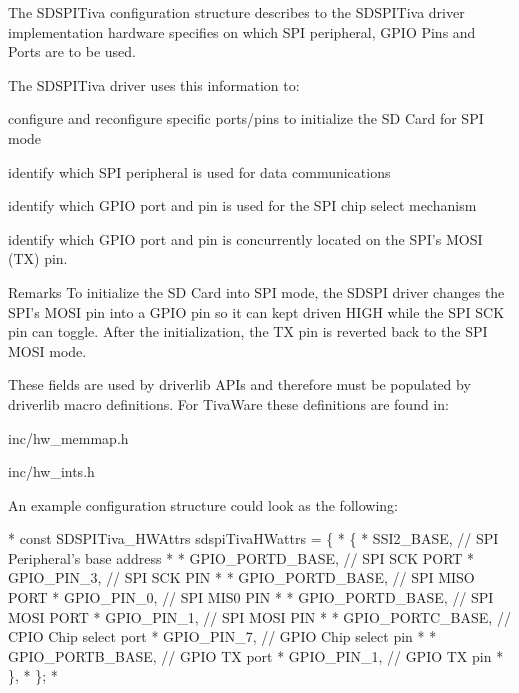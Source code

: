 The S\-D\-S\-P\-I\-Tiva configuration structure describes to the S\-D\-S\-P\-I\-Tiva driver implementation hardware specifies on which S\-P\-I peripheral, G\-P\-I\-O Pins and Ports are to be used.

The S\-D\-S\-P\-I\-Tiva driver uses this information to\-:
\begin{DoxyItemize}
\item configure and reconfigure specific ports/pins to initialize the S\-D Card for S\-P\-I mode
\item identify which S\-P\-I peripheral is used for data communications
\item identify which G\-P\-I\-O port and pin is used for the S\-P\-I chip select mechanism
\item identify which G\-P\-I\-O port and pin is concurrently located on the S\-P\-I's M\-O\-S\-I (T\-X) pin.
\end{DoxyItemize}

\begin{DoxyRemark}{Remarks}
To initialize the S\-D Card into S\-P\-I mode, the S\-D\-S\-P\-I driver changes the S\-P\-I's M\-O\-S\-I pin into a G\-P\-I\-O pin so it can kept driven H\-I\-G\-H while the S\-P\-I S\-C\-K pin can toggle. After the initialization, the T\-X pin is reverted back to the S\-P\-I M\-O\-S\-I mode.
\end{DoxyRemark}
These fields are used by driverlib A\-P\-Is and therefore must be populated by driverlib macro definitions. For Tiva\-Ware these definitions are found in\-:
\begin{DoxyItemize}
\item inc/hw\-\_\-memmap.\-h
\item inc/hw\-\_\-ints.\-h
\end{DoxyItemize}

An example configuration structure could look as the following\-: 
\begin{DoxyCode}
*  \textcolor{keyword}{const} SDSPITiva_HWAttrs sdspiTivaHWattrs = \{
*      \{
*           SSI2\_BASE, \textcolor{comment}{// SPI Peripheral's base address}
*
*           GPIO\_PORTD\_BASE, \textcolor{comment}{// SPI SCK PORT}
*           GPIO\_PIN\_3,      \textcolor{comment}{// SPI SCK PIN}
*
*           GPIO\_PORTD\_BASE, \textcolor{comment}{// SPI MISO PORT}
*           GPIO\_PIN\_0,      \textcolor{comment}{// SPI MIS0 PIN}
*
*           GPIO\_PORTD\_BASE, \textcolor{comment}{// SPI MOSI PORT}
*           GPIO\_PIN\_1,      \textcolor{comment}{// SPI MOSI PIN}
*
*           GPIO\_PORTC\_BASE, \textcolor{comment}{// CPIO Chip select port}
*           GPIO\_PIN\_7,      \textcolor{comment}{// GPIO Chip select pin}
*
*           GPIO\_PORTB\_BASE, \textcolor{comment}{// GPIO TX port}
*           GPIO\_PIN\_1,      \textcolor{comment}{// GPIO TX pin}
*       \},
*  \};
*  
\end{DoxyCode}
 

